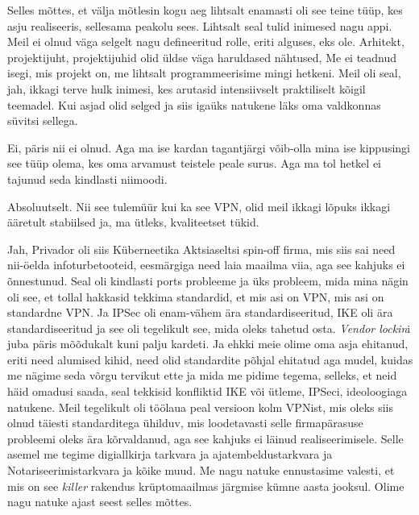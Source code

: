 
Selles mõttes, et välja mõtlesin kogu aeg lihtsalt enamasti oli see teine tüüp, 
kes asju realiseeris,  sellesama peakolu sees. Lihtsalt seal tulid inimesed 
nagu appi. Meil ei olnud  väga selgelt nagu defineeritud rolle, eriti alguses, 
eks ole. Arhitekt, projektijuht, projektijuhid olid üldse väga haruldased 
nähtused, Me ei teadnud isegi, mis projekt on, me lihtsalt programmeerisime 
mingi hetkeni. Meil oli seal, jah, ikkagi terve hulk inimesi, kes arutasid 
intensiivselt praktiliselt kõigil teemadel. Kui asjad olid selged ja siis 
igaüks natukene läks oma  valdkonnas  süvitsi sellega.


Ei, päris nii ei olnud. Aga ma ise kardan tagantjärgi võib-olla mina ise 
kippusingi see tüüp olema, kes oma  arvamust teistele peale surus. Aga ma tol 
hetkel ei tajunud seda kindlasti niimoodi. 


Absoluutselt. Nii see tulemüür kui ka see VPN, olid meil ikkagi lõpuks ikkagi 
ääretult stabiilsed ja, ma ütleks, kvaliteetset tükid. 

Jah, Privador oli siis Küberneetika Aktsiaseltsi spin-off 
firma, mis siis sai need nii-öelda infoturbetooteid, eesmärgiga need laia 
maailma viia, aga see kahjuks ei õnnestunud. Seal oli  kindlasti ports 
probleeme ja üks probleem, mida mina nägin oli see, et tollal hakkasid tekkima 
standardid, et mis asi on VPN, mis asi on standardne VPN. Ja IPSec oli 
enam-vähem ära standardiseeritud, IKE oli ära standardiseeritud ja see oli 
tegelikult see, mida oleks tahetud osta. \emph{Vendor lockin}i juba päris 
mõõdukalt kuni palju kardeti. Ja ehkki meie olime oma asja ehitanud, eriti need 
alumised kihid, need olid  standardite põhjal ehitatud aga mudel,  kuidas me 
nägime seda võrgu tervikut ette ja mida me pidime tegema, selleks, et neid häid 
omadusi saada,  seal tekkisid konfliktid IKE või ütleme, IPSeci, ideoloogiaga 
natukene. Meil  tegelikult oli töölaua peal  versioon kolm VPNist, mis oleks 
siis olnud täiesti standarditega ühilduv, mis loodetavasti selle  firmapärasuse 
probleemi oleks ära kõrvaldanud, aga see kahjuks ei läinud realiseerimisele. 
Selle asemel me tegime digiallkirja tarkvara ja ajatembeldustarkvara ja 
Notariseerimistarkvara ja kõike muud. Me nagu natuke ennustasime valesti, et 
mis on see \emph{killer} rakendus krüptomaailmas järgmise kümne aasta jooksul. 
Olime nagu natuke ajast seest selles mõttes.

